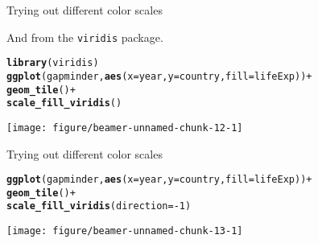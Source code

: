 \documentclass[table]{beamer}\usepackage[]{graphicx}\usepackage[]{color}
\makeatletter
\def\maxwidth{ %
  \ifdim\Gin@nat@width>\linewidth
    \linewidth
  \else
    \Gin@nat@width
  \fi
}
\newcommand{\hlnum}[1]{\textcolor[rgb]{0.686,0.059,0.569}{#1}}%
\newcommand{\hlopt}[1]{\textcolor[rgb]{0,0,0}{#1}}%
\newcommand{\hlstd}[1]{\textcolor[rgb]{0.345,0.345,0.345}{#1}}%
\newcommand{\hlkwc}[1]{\textcolor[rgb]{0.333,0.667,0.333}{#1}}%
\newcommand{\hlkwd}[1]{\textcolor[rgb]{0.737,0.353,0.396}{\textbf{#1}}}%
\newenvironment{kframe}{%
 \def\at@end@of@kframe{}%
 \ifinner\ifhmode%
  \def\at@end@of@kframe{\end{minipage}}%
  \begin{minipage}{\columnwidth}%
 \fi\fi%
 \def\FrameCommand##1{\hskip\@totalleftmargin \hskip-\fboxsep
 \colorbox{shadecolor}{##1}\hskip-\fboxsep
     \hskip-\linewidth \hskip-\@totalleftmargin \hskip\columnwidth}%
 \MakeFramed {\advance\hsize-\width
   \@totalleftmargin\z@ \linewidth\hsize
   \@setminipage}}%
 {\par\unskip\endMakeFramed%
 \at@end@of@kframe}
\newenvironment{knitrout}{}{} %
\makeatother
\begin{document}

\begin{frame}[fragile]{Trying out different color scales}

And from the {\tt viridis} package.

\begin{knitrout}\tiny
{}\color{fgcolor}\begin{kframe}
\begin{alltt}
\hlkwd{library}\hlstd{(viridis)}
\hlkwd{ggplot}\hlstd{(gapminder,} \hlkwd{aes}\hlstd{(}\hlkwc{x}\hlstd{=year,} \hlkwc{y}\hlstd{=country,} \hlkwc{fill}\hlstd{=lifeExp))} \hlopt{+}
    \hlkwd{geom_tile}\hlstd{()} \hlopt{+}
    \hlkwd{scale_fill_viridis}\hlstd{()}
\end{alltt}
\end{kframe}

{\centering \texttt{[image: figure/beamer-unnamed-chunk-12-1]} 

}


\end{knitrout}

\end{frame}


\begin{frame}[fragile]{Trying out different color scales}

\begin{knitrout}\tiny
{}\color{fgcolor}\begin{kframe}
\begin{alltt}
\hlkwd{ggplot}\hlstd{(gapminder,} \hlkwd{aes}\hlstd{(}\hlkwc{x}\hlstd{=year,} \hlkwc{y}\hlstd{=country,} \hlkwc{fill}\hlstd{=lifeExp))} \hlopt{+}
    \hlkwd{geom_tile}\hlstd{()} \hlopt{+}
    \hlkwd{scale_fill_viridis}\hlstd{(}\hlkwc{direction}\hlstd{=}\hlopt{-}\hlnum{1}\hlstd{)}
\end{alltt}
\end{kframe}

{\centering \texttt{[image: figure/beamer-unnamed-chunk-13-1]} 

}


\end{knitrout}

\end{frame}

\end{document}
